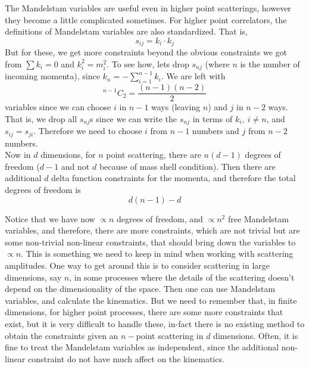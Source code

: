 \documentclass[11pt, notitlepage]{report}
\numberwithin{equation}{section}
\begin{document}
    The Mandelstam variables are useful even in higher point scatterings, however they become a little complicated sometimes. For higher point correlators, the definitions of Mandelstam variables are also standardized. That is, 
    \begin{equation*}
        s_{ij} = k_i\cdot k_j
    \end{equation*}
    But for these, we get more constraints beyond the obvious constraints we got from \(\sum k_i = 0\) and \(k_i^2 = m_i^2\). To see how, lets drop \(s_{nj}\) (where \(n\) is the number of incoming momenta), since \(k_n = -\sum_{i=1}^{n-1}k_i\). We are left with 
    \begin{equation*}
        {}^{n-1}C_2 = \frac{(n-1)(n-2)}{2}
    \end{equation*}
    variables since we can choose \(i\) in \(n-1\) ways (leaving \(n\)) and \(j\) in \(n-2\) ways. That is, we drop all \(s_{nj}\)s since we can write the \(s_{nj}\) in terms of \(k_i,~i\ne n\), and \(s_{ij} = s_{ji}\). Therefore we need to choose \(i\) from \(n-1\) numbers and \(j\) from \(n-2\) numbers. \\

    Now in \(d\) dimensions, for \(n\) point scattering, there are \(n(d-1)\) degrees of freedom (\(d-1\) and not \(d\) because of mass shell condition). Then there are additional \(d\) delta function constraints for the momenta, and therefore the total degrees of freedom is 
    \begin{equation*}
        d(n-1) - d
    \end{equation*}

    Notice that we have now \(\propto n\) degrees of freedom, and \(\propto n^2\) free Mandelstam variables, and therefore, there are more constraints, which are not trivial but are some non-trivial non-linear constraints, that should bring down the variables to \(\propto n\). This is something we need to keep in mind when working with scattering amplitudes. One way to get around this is to consider scattering in large dimensions, say \(n\), in some processes where the details of the scattering doesn't depend on the dimensionality of the space. Then one can use Mandelstam variables, and calculate the kinematics. But we need to remember that, in finite dimensions, for higher point processes, there are some more constraints that exist, but it is very difficult to handle these, in-fact there is no existing method to obtain the constraints given an \(n-\)point scattering in \(d\) dimensions. Often, it is fine to treat the Mandelstam variables as independent, since the additional non-linear constraint do not have much affect on the kinematics.
\end{document}
